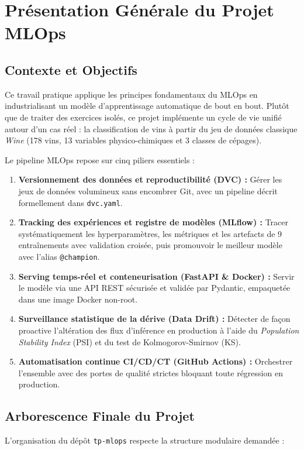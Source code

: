 \documentclass[12pt,a4paper]{article}
\begin{document}
\tableofcontents
\newpage

\section{Présentation Générale du Projet MLOps}

\subsection{Contexte et Objectifs}
Ce travail pratique applique les principes fondamentaux du MLOps en industrialisant un modèle d'apprentissage automatique de bout en bout. Plutôt que de traiter des exercices isolés, ce projet implémente un cycle de vie unifié autour d'un cas réel : la classification de vins à partir du jeu de données classique \textit{Wine} (178 vins, 13 variables physico-chimiques et 3 classes de cépages).

Le pipeline MLOps repose sur cinq piliers essentiels :
\begin{enumerate}
  \item \textbf{Versionnement des données et reproductibilité (DVC) :} Gérer les jeux de données volumineux sans encombrer Git, avec un pipeline décrit formellement dans \texttt{dvc.yaml}.
  \item \textbf{Tracking des expériences et registre de modèles (MLflow) :} Tracer systématiquement les hyperparamètres, les métriques et les artefacts de 9 entraînements avec validation croisée, puis promouvoir le meilleur modèle avec l'alias \texttt{@champion}.
  \item \textbf{Serving temps-réel et conteneurisation (FastAPI \& Docker) :} Servir le modèle via une API REST sécurisée et validée par Pydantic, empaquetée dans une image Docker non-root.
  \item \textbf{Surveillance statistique de la dérive (Data Drift) :} Détecter de façon proactive l'altération des flux d'inférence en production à l'aide du \textit{Population Stability Index} (PSI) et du test de Kolmogorov-Smirnov (KS).
  \item \textbf{Automatisation continue CI/CD/CT (GitHub Actions) :} Orchestrer l'ensemble avec des portes de qualité strictes bloquant toute régression en production.
\end{enumerate}

\subsection{Arborescence Finale du Projet}
L'organisation du dépôt \texttt{tp-mlops} respecte la structure modulaire demandée :
\end{document}
